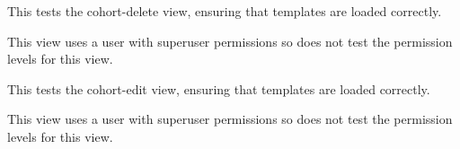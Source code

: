 \documentclass[letterpaper,10pt,english]{sphinxmanual}
\begin{document}
\begin{fulllineitems}
\begin{fulllineitems}
\label{data:mousedb.data.tests.CohortViewTests.test_cohort_view_delete}
This tests the cohort-delete view, ensuring that templates are loaded correctly.

This view uses a user with superuser permissions so does not test the permission levels for this view.

\end{fulllineitems}


\begin{fulllineitems}
\label{data:mousedb.data.tests.CohortViewTests.test_cohort_view_edit}
This tests the cohort-edit view, ensuring that templates are loaded correctly.

This view uses a user with superuser permissions so does not test the permission levels for this view.

\end{fulllineitems}


\end{fulllineitems}

\end{document}
